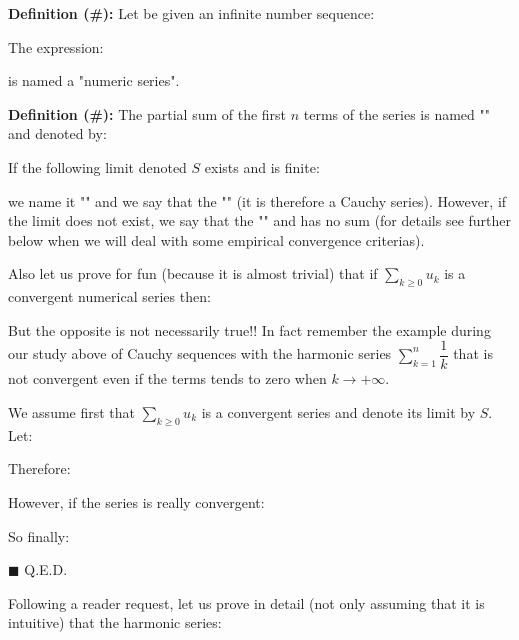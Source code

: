 \textbf{Definition (\#\mydef):} Let be given an infinite number sequence:
	
	The expression:
	
	is named a "numeric series".
	
	\textbf{Definition (\#\mydef):} The partial sum of the first $n$ terms of the series is named "\label{partial sum}" and denoted by:
	
	If the following limit denoted $S$ exists and is finite:
	
	we name it "" and we say that the "" (it is therefore a  Cauchy series). However, if the limit does not exist, we say that the "" and has no sum (for details see further below when we will deal with some empirical convergence criterias).
	\begin{theorem}
		Also let us prove for fun (because it is almost trivial) that if $\displaystyle \sum_{k\geq 0} u_k $ is a convergent numerical series then:
		
		But the opposite is not necessarily true!! In fact remember the example during our study above of Cauchy sequences with the harmonic series $\sum_{k=1}^n \dfrac{1}{k}$ that is not convergent even if the terms tends to zero when $k \rightarrow +\infty$.
	\end{theorem}
	\begin{dem}
		We assume first that $\displaystyle \sum_{k\geq 0} u_k $ is a convergent series and denote its limit by $S$. Let:
		
		Therefore:
		
		However, if the series is really convergent:
		
		So finally:
		
		\begin{flushright}
			$\blacksquare$  Q.E.D.
		\end{flushright}
	\end{dem}
	Following a reader request, let us prove in detail (not only assuming that it is intuitive) that the harmonic series\label{harmonic series}:
	

